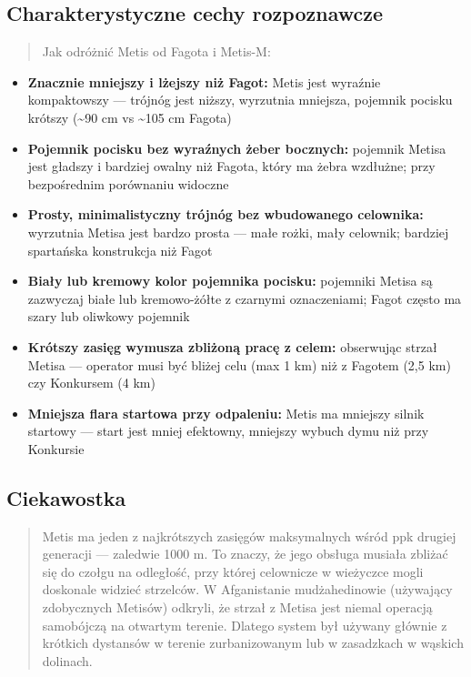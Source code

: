 \documentclass[12pt,oneside]{book}
\providecommand{\tightlist}{%
  \setlength{\itemsep}{0pt}\setlength{\parskip}{0pt}}
\begin{document}
\subsection{Charakterystyczne cechy
rozpoznawcze}\label{charakterystyczne-cechy-rozpoznawcze-51}

\begin{quote}
Jak odróżnić Metis od Fagota i Metis-M:
\end{quote}

\begin{itemize}
\tightlist
\item
  \textbf{Znacznie mniejszy i lżejszy niż Fagot:} Metis jest wyraźnie
  kompaktowszy --- trójnóg jest niższy, wyrzutnia mniejsza, pojemnik
  pocisku krótszy (\textasciitilde90 cm vs \textasciitilde105 cm Fagota)
\item
  \textbf{Pojemnik pocisku bez wyraźnych żeber bocznych:} pojemnik
  Metisa jest gładszy i bardziej owalny niż Fagota, który ma żebra
  wzdłużne; przy bezpośrednim porównaniu widoczne
\item
  \textbf{Prosty, minimalistyczny trójnóg bez wbudowanego celownika:}
  wyrzutnia Metisa jest bardzo prosta --- małe rożki, mały celownik;
  bardziej spartańska konstrukcja niż Fagot
\item
  \textbf{Biały lub kremowy kolor pojemnika pocisku:} pojemniki Metisa
  są zazwyczaj białe lub kremowo-żółte z czarnymi oznaczeniami; Fagot
  często ma szary lub oliwkowy pojemnik
\item
  \textbf{Krótszy zasięg wymusza zbliżoną pracę z celem:} obserwując
  strzał Metisa --- operator musi być bliżej celu (max 1 km) niż z
  Fagotem (2,5 km) czy Konkursem (4 km)
\item
  \textbf{Mniejsza flara startowa przy odpaleniu:} Metis ma mniejszy
  silnik startowy --- start jest mniej efektowny, mniejszy wybuch dymu
  niż przy Konkursie
\end{itemize}

\subsection{Ciekawostka}\label{ciekawostka-51}

\begin{quote}
Metis ma jeden z najkrótszych zasięgów maksymalnych wśród ppk drugiej
generacji --- zaledwie 1000 m. To znaczy, że jego obsługa musiała
zbliżać się do czołgu na odległość, przy której celownicze w wieżyczce
mogli doskonale widzieć strzelców. W Afganistanie mudżahedinowie
(używający zdobycznych Metisów) odkryli, że strzał z Metisa jest niemal
operacją samobójczą na otwartym terenie. Dlatego system był używany
głównie z krótkich dystansów w terenie zurbanizowanym lub w zasadzkach w
wąskich dolinach.
\end{quote}
\end{document}
